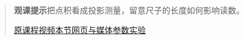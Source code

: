 \begin{quote}\small\textbf{观课提示}\quad 把点积看成投影测量，留意尺子的长度如何影响读数。

\href{https://www.youtube.com/watch?v=LyGKycYT2v0}{原课程视频}\quad\href{https://vitael04213.github.io/3blue1brown-notes/lessons/dot-products.html}{本节网页与媒体}\quad\href{https://vitael04213.github.io/3blue1brown-notes/lab.html\#projection}{参数实验}
\end{quote}
